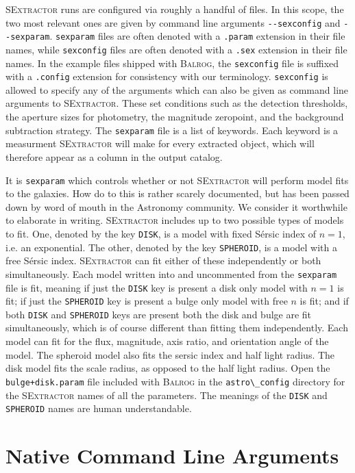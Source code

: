 \documentclass[12pt]{book}
\newcommand{\codett}[1]{\lstinline{#1}}
\newcommand{\balrog}{\textsc{Balrog}}
\newcommand{\sex}{\textsc{SExtractor}}
\newcommand{\opt}[1]{\codett{--#1}}
\newcommand{\sersic}{S\'{e}rsic}
\begin{document}
\sex{} runs are configured via roughly a handful of files. 
In this scope, the two most relevant ones are given by command line arguments \opt{sexconfig}
and \opt{sexparam}. 
\codett{sexparam} files are often denoted with a \codett{.param} extension in their file names,
while \codett{sexconfig} files are often denoted with a \codett{.sex} extension in their file names.
In the example files shipped with \balrog{}, the \codett{sexconfig}
file is suffixed with a \codett{.config} extension for consistency with our terminology.
\codett{sexconfig} is allowed to specify any of the arguments which can
also be given as command line arguments to \sex{}.
These set conditions such as the detection thresholds,
the aperture sizes for photometry, the magnitude zeropoint,
and the background subtraction strategy.
The \codett{sexparam} file is a list of keywords.
Each keyword is a measurment \sex{} will make for every extracted object, which will therefore
appear as a column in the output catalog.

It is \codett{sexparam} which controls whether or not \sex{} will perform model fits to the galaxies. 
How do to this is rather scarely documented, but has been passed down by word of mouth in the Astronomy community. 
We consider it worthwhile to elaborate in writing.
\sex{} includes up to two possible types of models to fit.
One, denoted by the key \codett{DISK}, is a model with fixed \sersic{} index of $n=1$,
i.e. an exponential.
The other, denoted by the key \codett{SPHEROID}, is a model with a free \sersic{} index.
\sex{} can fit either of these independently or both simultaneously.
Each model written into and uncommented from the \codett{sexparam} file is fit,
meaning if just the \codett{DISK} key is present a disk only model with $n=1$ is fit;
if just the \codett{SPHEROID} key is present a bulge only model with free $n$ is fit;
and if both \codett{DISK} and \codett{SPHEROID} keys are present both the
disk and bulge are fit simultaneously, which is of course different than fitting them independently.
Each model can fit for the flux, magnitude, axis ratio, and orientation angle of the model.
The spheroid model also fits the sersic index and half light radius.
The disk model fits the scale radius, as opposed to the half light radius.
Open the \codett{bulge+disk.param} file included with \balrog{} in the \codett{astro\_config} directory
for the \sex{} names of all the parameters.
The meanings of the \codett{DISK} and \codett{SPHEROID} names are human understandable.


\chapter{Native Command Line Arguments}
\label{sec:cmdline}
\end{document}
